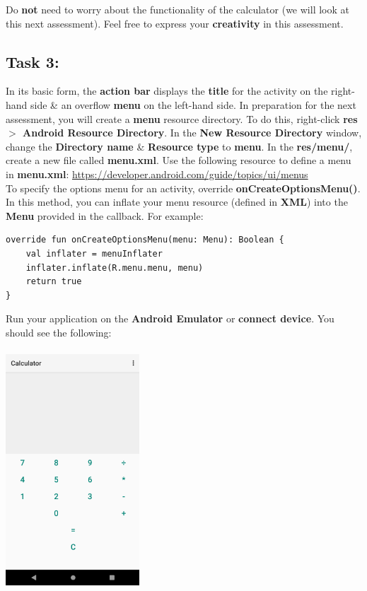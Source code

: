 \documentclass{article}
\begin{document}
Do \textbf{not} need to worry about the functionality of the calculator (we will look at this next assessment). Feel free to express your \textbf{creativity} in this assessment.

\subsection*{Task 3:} In its basic form, the \textbf{action bar} displays the \textbf{title} for the activity on the right-hand side \& an overflow \textbf{menu} on the left-hand side. In preparation for the next assessment, you will create a \textbf{menu} resource directory. To do this, right-click \textbf{res $>$ Android Resource Directory}. In the \textbf{New Resource Directory} window, change the \textbf{Directory name} \& \textbf{Resource type} to \textbf{menu}. In the \textbf{res/menu/}, create a new file called \textbf{menu.xml}. Use the following resource to define a menu in \textbf{menu.xml}: \href{https://developer.android.com/guide/topics/ui/menus}{https://developer.android.com/guide/topics/ui/menus} \\

To specify the options menu for an activity, override \textbf{onCreateOptionsMenu()}. In this method, you can inflate your menu resource (defined in \textbf{XML}) into the \textbf{Menu} provided in the callback. For example:

\begin{verbatim}
override fun onCreateOptionsMenu(menu: Menu): Boolean {
    val inflater = menuInflater
    inflater.inflate(R.menu.menu, menu)
    return true
}
\end{verbatim}

Run your application on the \textbf{Android Emulator} or \textbf{connect device}. You should see the following:

\includegraphics[width=5cm, height=9cm]{./img/02-android-overview/calculator-with-menu.png}  \\
\end{document}

